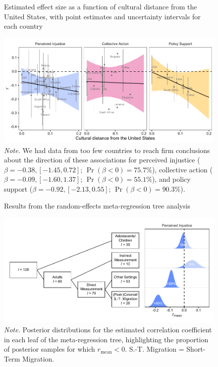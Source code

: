 \documentclass[12pt, letterpaper]{article}
\begin{document}
\begin{figure}
\centering
\caption{Estimated effect size as a function of cultural distance from the United States, with point estimates and uncertainty intervals for each country}
\includegraphics[scale=1]{../figures/figure-5}
\caption*{\textit{Note.} We had data from too few countries to reach firm conclusions about the direction of these associations for perceived injustice ($\beta = -0.38, [-1.45, 0.72]$; $\Pr (\beta < 0) = 75.7\%$), collective action ($\beta = -0.09, [-1.60, 1.37]$; $\Pr (\beta < 0) = 55.1\%$), and policy support ($\beta = -0.92, [-2.13, 0.55]$; $\Pr (\beta < 0) = 90.3\%$).}
\label{fig:f5}
\end{figure}

\begin{figure}
\centering
\caption{Results from the random-effects meta-regression tree analysis}
\includegraphics[scale=1]{../figures/figure-6}
\caption*{\textit{Note.} Posterior distributions for the estimated correlation coefficient in each leaf of the meta-regression tree, highlighting the proportion of posterior samples for which $r_\text{mean} < 0$.  S.-T. Migration = Short-Term Migration.}
\label{fig:f6}
\end{figure}
\end{document}
